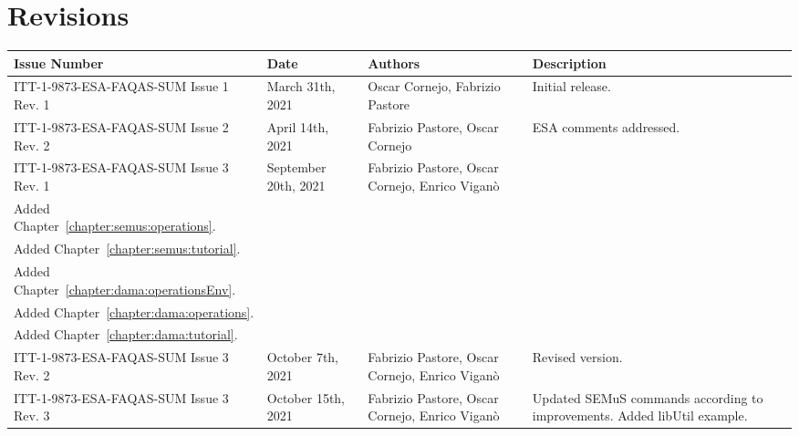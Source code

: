 
\section*{Revisions}
\label{sec:revisions}

\setlength\LTleft{0pt}
\setlength\LTright{0pt}
\scriptsize 
\begin{longtable}{|p{2cm}|p{2cm}|p{2cm}|p{8cm}|@{}}
\label{table:codeoperators} \\
\hline
\textbf{Issue Number}&\textbf{Date}&\textbf{Authors}&\textbf{Description}\\
\hline
ITT-1-9873-ESA-FAQAS-SUM
Issue 1 Rev. 1&
March 31th, 2021&
Oscar Cornejo, Fabrizio Pastore&
\begin{minipage}{8cm}
Initial release.
\end{minipage}
\\
\hline
ITT-1-9873-ESA-FAQAS-SUM
Issue 2 Rev. 2&
April 14th, 2021&
Fabrizio Pastore, Oscar Cornejo&
\begin{minipage}{8cm}
ESA comments addressed.
\end{minipage}
\\
\hline
ITT-1-9873-ESA-FAQAS-SUM
Issue 3 Rev. 1&
September 20th, 2021&
Fabrizio Pastore, Oscar Cornejo, Enrico Viganò&
\begin{minipage}{8cm}
Added Chapter~\ref{chapter:semus:operationsEnv}.\\
Added Chapter~\ref{chapter:semus:operations}.\\
Added Chapter~\ref{chapter:semus:tutorial}.\\
Added Chapter~\ref{chapter:dama:operationsEnv}.\\
Added Chapter~\ref{chapter:dama:operations}.\\
Added Chapter~\ref{chapter:dama:tutorial}.
\end{minipage}
\\
\hline
ITT-1-9873-ESA-FAQAS-SUM
Issue 3 Rev. 2&
October 7th, 2021&
Fabrizio Pastore, Oscar Cornejo, Enrico Viganò&
\begin{minipage}{8cm}
Revised version.
\end{minipage}
\\
\hline
ITT-1-9873-ESA-FAQAS-SUM
Issue 3 Rev. 3&
October 15th, 2021&
Fabrizio Pastore, Oscar Cornejo, Enrico Viganò&
\begin{minipage}{8cm}
Updated SEMuS commands according to improvements.
Added libUtil example.
\end{minipage}
\\


\end{longtable}
